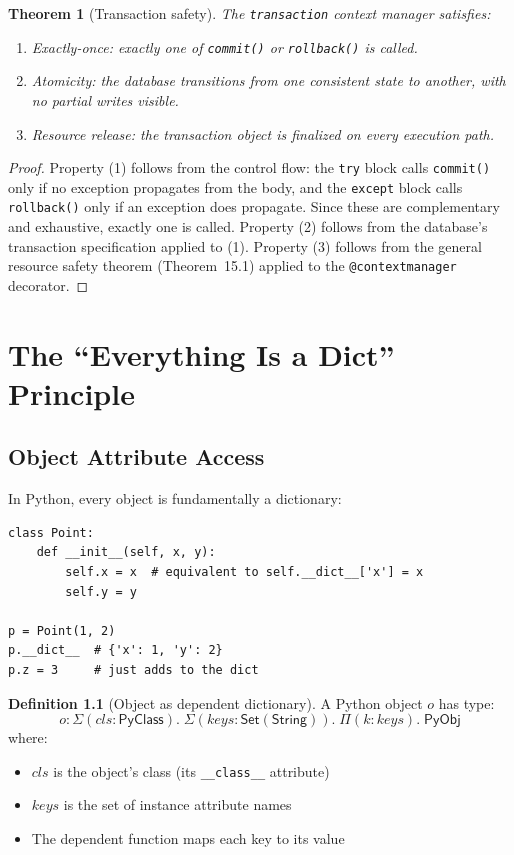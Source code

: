 \documentclass[11pt,a4paper]{report}
\theoremstyle{definition}
\newtheorem{definition}{Definition}[chapter]
\theoremstyle{plain}
\newtheorem{theorem}[definition]{Theorem}
\newcommand{\PyObj}{\mathsf{PyObj}}
\newcommand{\PyClass}{\mathsf{PyClass}}
\begin{document}
\begin{theorem}[Transaction safety]
The \lstinline[style=python]{transaction} context manager satisfies:
\begin{enumerate}
  \item \emph{Exactly-once}: exactly one of \texttt{commit()} or
    \texttt{rollback()} is called.
  \item \emph{Atomicity}: the database transitions from one consistent state
    to another, with no partial writes visible.
  \item \emph{Resource release}: the transaction object is finalized on every
    execution path.
\end{enumerate}
\end{theorem}
\begin{proof}
Property (1) follows from the control flow: the \texttt{try} block calls
\texttt{commit()} only if no exception propagates from the body, and the
\texttt{except} block calls \texttt{rollback()} only if an exception does
propagate.  Since these are complementary and exhaustive, exactly one is
called.  Property (2) follows from the database's transaction specification
applied to (1).  Property (3) follows from the general resource safety
theorem (Theorem~15.1) applied to the \texttt{@contextmanager} decorator.
\end{proof}


\chapter{The ``Everything Is a Dict'' Principle}
\label{ch:dict}

\section{Object Attribute Access}

In Python, every object is fundamentally a dictionary:

\begin{lstlisting}[style=python]
class Point:
    def __init__(self, x, y):
        self.x = x  # equivalent to self.__dict__['x'] = x
        self.y = y

p = Point(1, 2)
p.__dict__  # {'x': 1, 'y': 2}
p.z = 3     # just adds to the dict
\end{lstlisting}

\begin{definition}[Object as dependent dictionary]
A Python object $o$ has type:
\[
  o : \Sigma(\mathit{cls} : \PyClass).\; \Sigma(\mathit{keys} : \mathsf{Set}(\mathsf{String})).\;
    \Pi(k : \mathit{keys}).\; \PyObj
\]
where:
\begin{itemize}
  \item $\mathit{cls}$ is the object's class (its \texttt{\_\_class\_\_} attribute)
  \item $\mathit{keys}$ is the set of instance attribute names
  \item The dependent function maps each key to its value
\end{itemize}
\end{definition}
\end{document}
